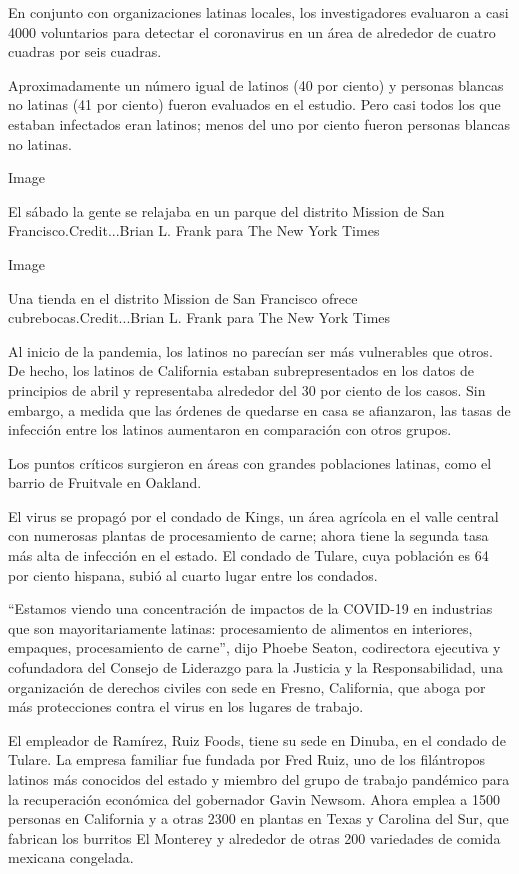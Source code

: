 En conjunto con organizaciones latinas locales, los investigadores
evaluaron a casi 4000 voluntarios para detectar el coronavirus en un
área de alrededor de cuatro cuadras por seis cuadras.

Aproximadamente un número igual de latinos (40 por ciento) y personas
blancas no latinas (41 por ciento) fueron evaluados en el estudio. Pero
casi todos los que estaban infectados eran latinos; menos del uno por
ciento fueron personas blancas no latinas.

Image

El sábado la gente se relajaba en un parque del distrito Mission de San
Francisco.Credit...Brian L. Frank para The New York Times

Image

Una tienda en el distrito Mission de San Francisco ofrece
cubrebocas.Credit...Brian L. Frank para The New York Times

Al inicio de la pandemia, los latinos no parecían ser más vulnerables
que otros. De hecho, los latinos de California estaban subrepresentados
en los datos de principios de abril y representaba alrededor del 30 por
ciento de los casos. Sin embargo, a medida que las órdenes de quedarse
en casa se afianzaron, las tasas de infección entre los latinos
aumentaron en comparación con otros grupos.

Los puntos críticos surgieron en áreas con grandes poblaciones latinas,
como el barrio de Fruitvale en Oakland.

El virus se propagó por el condado de Kings, un área agrícola en el
valle central con numerosas plantas de procesamiento de carne; ahora
tiene la segunda tasa más alta de infección en el estado. El condado de
Tulare, cuya población es 64 por ciento hispana, subió al cuarto lugar
entre los condados.

``Estamos viendo una concentración de impactos de la COVID-19 en
industrias que son mayoritariamente latinas: procesamiento de alimentos
en interiores, empaques, procesamiento de carne'', dijo Phoebe Seaton,
codirectora ejecutiva y cofundadora del Consejo de Liderazgo para la
Justicia y la Responsabilidad, una organización de derechos civiles con
sede en Fresno, California, que aboga por más protecciones contra el
virus en los lugares de trabajo.

El empleador de Ramírez, Ruiz Foods, tiene su sede en Dinuba, en el
condado de Tulare. La empresa familiar fue fundada por Fred Ruiz, uno de
los filántropos latinos más conocidos del estado y miembro del grupo de
trabajo pandémico para la recuperación económica del gobernador Gavin
Newsom. Ahora emplea a 1500 personas en California y a otras 2300 en
plantas en Texas y Carolina del Sur, que fabrican los burritos El
Monterey y alrededor de otras 200 variedades de comida mexicana
congelada.

